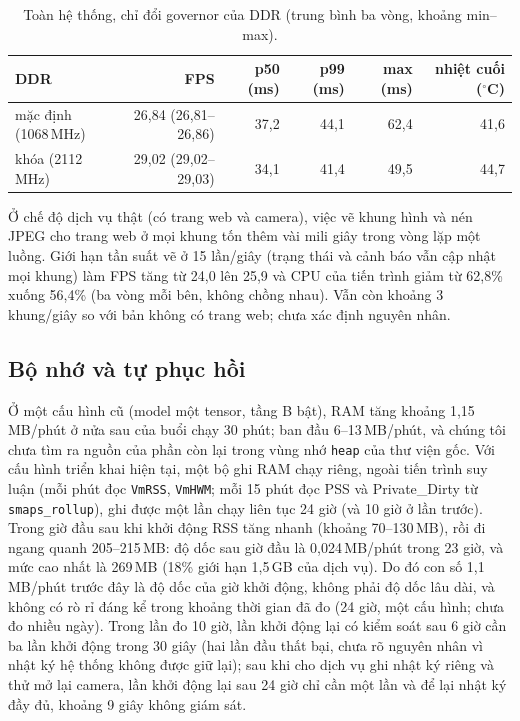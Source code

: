 \documentclass[12pt,a4paper]{article}
\begin{document}
\begin{table}[ht]
\centering
\caption{Toàn hệ thống, chỉ đổi governor của DDR (trung bình ba vòng, khoảng min--max).}
\label{tab:ddr}
\small
\begin{tabular}{lrrrrr}
\toprule
DDR & FPS & p50 (ms) & p99 (ms) & max (ms) & nhiệt cuối ($^\circ$C) \\
\midrule
mặc định (1068\,MHz) & 26,84 (26,81--26,86) & 37,2 & 44,1 & 62,4 & 41,6 \\
khóa (2112\,MHz) & 29,02 (29,02--29,03) & 34,1 & 41,4 & 49,5 & 44,7 \\
\bottomrule
\end{tabular}
\end{table}

Ở chế độ dịch vụ thật (có trang web và camera), việc vẽ khung hình và nén JPEG cho trang web ở mọi khung tốn thêm vài mili giây trong vòng lặp một luồng.
Giới hạn tần suất vẽ ở 15 lần/giây (trạng thái và cảnh báo vẫn cập nhật mọi khung) làm FPS tăng từ 24,0 lên 25,9 và CPU của tiến trình giảm từ 62,8\% xuống 56,4\%
(ba vòng mỗi bên, không chồng nhau). Vẫn còn khoảng 3 khung/giây so với bản không có trang web; chưa xác định nguyên nhân.

\subsection{Bộ nhớ và tự phục hồi}

Ở một cấu hình cũ (model một tensor, tầng B bật), RAM tăng khoảng 1,15\,MB/phút ở nửa sau của buổi chạy 30 phút; ban đầu 6--13\,MB/phút, và chúng tôi chưa tìm
ra nguồn của phần còn lại trong vùng nhớ \texttt{heap} của thư viện gốc. Với cấu hình triển khai hiện tại, một bộ ghi RAM chạy riêng, ngoài tiến trình suy luận (mỗi phút
đọc \texttt{VmRSS}, \texttt{VmHWM}; mỗi 15 phút đọc PSS và Private\_Dirty từ \texttt{smaps\_rollup}), ghi được một lần chạy liên tục 24 giờ (và 10 giờ ở lần trước). Trong giờ đầu sau khi khởi động RSS tăng
nhanh (khoảng 70--130\,MB), rồi đi ngang quanh 205--215\,MB: độ dốc sau giờ đầu là 0,024\,MB/phút trong 23 giờ, và mức cao nhất là 269\,MB
(18\% giới hạn 1,5\,GB của dịch vụ). Do đó con số 1,1\,MB/phút trước đây là độ dốc của giờ khởi động, không phải độ dốc lâu dài, và không có rò rỉ đáng kể
trong khoảng thời gian đã đo (24 giờ, một cấu hình; chưa đo nhiều ngày). Trong lần đo 10 giờ, lần khởi động lại có kiểm soát sau 6 giờ cần ba lần khởi động trong 30 giây
(hai lần đầu thất bại, chưa rõ nguyên nhân vì nhật ký hệ thống không được giữ lại); sau khi cho dịch vụ ghi nhật ký riêng và thử mở lại camera, lần khởi động lại sau 24 giờ chỉ cần một lần
và để lại nhật ký đầy đủ, khoảng 9 giây không giám sát.
\end{document}
